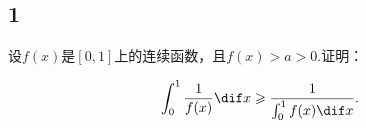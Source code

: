 \subsection{1}

设$f(x)$是$[0,1]$上的连续函数，且$f(x)>a>0$.证明：

\begin{equation}
	\int^1_0 \frac{1}{f(x)} \dif x \geqslant \frac{1}{\int ^1_0 f(x) \dif x}.
\end{equation}

